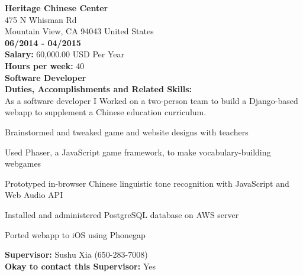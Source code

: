 \noindent\textbf{Heritage Chinese Center}\\
475 N Whisman Rd\\
Mountain View, CA   94043 United States\\
\textbf{06/2014 - 04/2015}\\
\textbf{Salary:} 60,000.00  USD Per Year\\
\textbf{Hours per week:} 40\\
\textbf{Software Developer}\\
\textbf{Duties, Accomplishments and Related Skills:}\\
As a software developer I Worked on a two-person team to build a Django-based
webapp to supplement a Chinese education curriculum.
\begin{tightlist}
\item Brainstormed and tweaked game and website designs with teachers

\item Used Phaser, a JavaScript game framework, to make vocabulary-building webgames

\item Prototyped in-browser Chinese linguistic tone recognition with JavaScript and Web Audio API

\item Installed and administered PostgreSQL database on AWS server

\item Ported webapp to iOS using Phonegap
\end{tightlist}
\textbf{Supervisor:} Sushu Xia (650-283-7008)\\
\textbf{Okay to contact this Supervisor:} Yes\\

